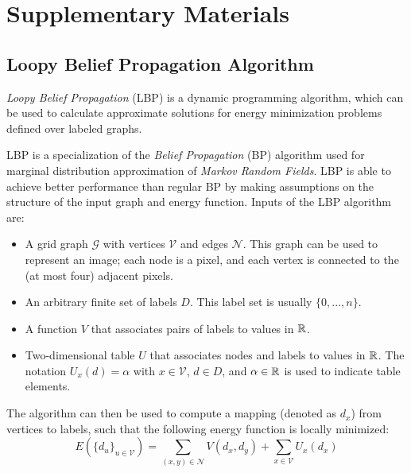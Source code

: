 \documentclass[notitlepage,english]{hgbreport}
\newcommand{\Acronym}[1]{{#1}}
\newcommand{\LBP}{\Acronym{LBP}}
\newcommand{\Vertices}{\mathcal{V}}
\newcommand{\Edges}{\mathcal{N}}
\newcommand{\Graph}{\mathcal{G}}
\begin{document}
\appendix %


\chapter{Supplementary Materials}


\section{Loopy Belief Propagation Algorithm}
\label{app:LBP}
\emph{Loopy Belief Propagation} (\LBP) \cite{Felzenszwalb2006} is a dynamic programming algorithm, which can be used to calculate approximate solutions for energy minimization problems defined over labeled graphs. 

\LBP{} is a specialization of the \emph{Belief Propagation} (\Acronym{BP}) algorithm used for {marginal distribution} approximation of \emph{Markov Random Fields}. \LBP{} is able to achieve better performance than regular \Acronym{BP} by making assumptions on the structure of the input graph and energy function.
Inputs of the \LBP{} algorithm are:
\begin{itemize}
	\item A grid graph $\Graph$ with vertices $\Vertices$ and edges $\Edges$. This graph can be used to represent an image; each node is a pixel, and each vertex is connected to the (at  most four) adjacent pixels. 
	\item An arbitrary finite set of labels $D$. This label set is usually $\{0, ... , n\}$.
	\item A function $V$ that associates pairs of labels to values in $\mathbb{R}$.
	\item Two-dimensional table $U$ that associates nodes and labels to values in $\mathbb{R}$. The notation $U_x(d) = \alpha$ with $x\in\Vertices$, $d\in D$, and $\alpha \in \mathbb{R}$ is used to indicate table elements.
\end{itemize}
The algorithm can then be used to compute a mapping (denoted as $d_x$) from vertices to labels, such that the following energy function is locally minimized:
\begin{equation} \label{eq:lbp-example-energy}
E(\{d_u\}_{u\in\Vertices}) = \sum_{(x,y)\in \Edges} V(d_x,d_y) + \sum_{x\in\Vertices} U_x(d_x) 
\end{equation}
\newpage
\end{document}
